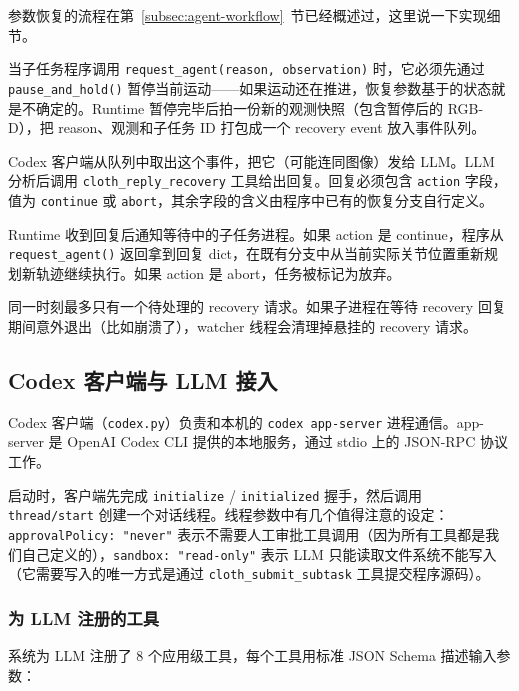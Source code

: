参数恢复的流程在第~\ref{subsec:agent-workflow}~节已经概述过，这里说一下实现细节。

当子任务程序调用 \texttt{request\_agent(reason, observation)} 时，它必须先通过 \texttt{pause\_and\_hold()} 暂停当前运动——如果运动还在推进，恢复参数基于的状态就是不确定的。Runtime 暂停完毕后拍一份新的观测快照（包含暂停后的 RGB-D），把 reason、观测和子任务 ID 打包成一个 recovery event 放入事件队列。

Codex 客户端从队列中取出这个事件，把它（可能连同图像）发给 LLM。LLM 分析后调用 \texttt{cloth\_reply\_recovery} 工具给出回复。回复必须包含 \texttt{action} 字段，值为 \texttt{continue} 或 \texttt{abort}，其余字段的含义由程序中已有的恢复分支自行定义。

Runtime 收到回复后通知等待中的子任务进程。如果 action 是 continue，程序从 \texttt{request\_agent()} 返回拿到回复 dict，在既有分支中从当前实际关节位置重新规划新轨迹继续执行。如果 action 是 abort，任务被标记为放弃。

同一时刻最多只有一个待处理的 recovery 请求。如果子进程在等待 recovery 回复期间意外退出（比如崩溃了），watcher 线程会清理掉悬挂的 recovery 请求。


\subsection{Codex 客户端与 LLM 接入}
\label{subsec:agent-codex}

Codex 客户端（\texttt{codex.py}）负责和本机的 \texttt{codex app-server} 进程通信。app-server 是 OpenAI Codex CLI 提供的本地服务，通过 stdio 上的 JSON-RPC 协议工作。

启动时，客户端先完成 \texttt{initialize} / \texttt{initialized} 握手，然后调用 \texttt{thread/start} 创建一个对话线程。线程参数中有几个值得注意的设定：\texttt{approvalPolicy: "never"} 表示不需要人工审批工具调用（因为所有工具都是我们自己定义的），\texttt{sandbox: "read-only"} 表示 LLM 只能读取文件系统不能写入（它需要写入的唯一方式是通过 \texttt{cloth\_submit\_subtask} 工具提交程序源码）。

\subsubsection{为 LLM 注册的工具}

系统为 LLM 注册了 8 个应用级工具，每个工具用标准 JSON Schema 描述输入参数：

